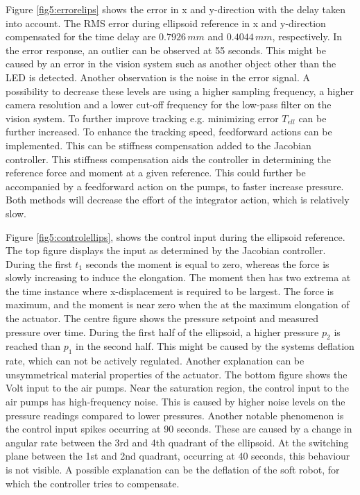 Figure \ref{fig5:errorelips} shows the error in x and y-direction with the delay taken into account. The RMS error during ellipsoid reference in x and y-direction compensated for the time delay are $0.7926 \hspace{2pt} mm$ and $0.4044  \hspace{2pt} mm$, respectively. In the error response, an outlier can be observed at 55 seconds. This might be caused by an error in the vision system such as another object other than the LED is detected. Another observation is the noise in the error signal. A possibility to decrease these levels are using a higher sampling frequency, a higher camera resolution and a lower cut-off frequency for the low-pass filter on the vision system. To further improve tracking e.g. minimizing error $T_{ell}$ can be further increased. To enhance the tracking speed, feedforward actions can be implemented. This can be stiffness compensation added to the Jacobian controller. This stiffness compensation aids the controller in determining the reference force and moment at a given reference. This could further be accompanied by a feedforward action on the pumps, to faster increase pressure. Both methods will decrease the effort of the integrator action, which is relatively slow. 

Figure \ref{fig5:controlellips}, shows the control input during the ellipsoid reference. The top figure displays the input as determined by the Jacobian controller. During the first $t_1$ seconds the moment is equal to zero, whereas the force is slowly increasing to induce the elongation. The moment then has two extrema at the time instance where x-displacement is required to be largest. The force is maximum, and the moment is near zero when the at the maximum elongation of the actuator. The centre figure shows the pressure setpoint and measured pressure over time. During the first half of the ellipsoid, a higher pressure $p_2$ is reached than $p_1$ in the second half. This might be caused by the systems deflation rate, which can not be actively regulated. Another explanation can be unsymmetrical material properties of the actuator. The bottom figure shows the Volt input to the air pumps. Near the saturation region, the control input to the air pumps has high-frequency noise. This is caused by higher noise levels on the pressure readings compared to lower pressures. Another notable phenomenon is the control input spikes occurring at 90 seconds. These are caused by a change in angular rate between the 3rd and 4th quadrant of the ellipsoid. At the switching plane between the 1st and 2nd quadrant, occurring at 40 seconds, this behaviour is not visible. A possible explanation can be the deflation of the soft robot, for which the controller tries to compensate. 





